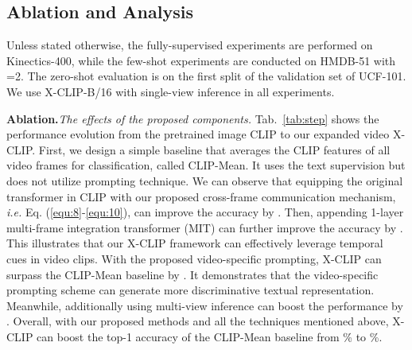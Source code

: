 \documentclass[runningheads]{llncs}
\begin{document}
 

\subsection{Ablation and Analysis}\label{sec:ablation}
Unless stated otherwise, the fully-supervised experiments are performed on Kinectics-400, while the few-shot experiments are conducted on HMDB-51 with =2. The zero-shot evaluation is on the first split of the validation set of UCF-101. We use X-CLIP-B/16 with single-view inference in all experiments.

\noindent\textbf{Ablation.}\textit{The effects of the proposed components.} Tab.~\ref{tab:step} shows the performance evolution from the pretrained image CLIP to our expanded video X-CLIP. First, we design a simple baseline that averages the CLIP features of all video frames for classification, called CLIP-Mean. It uses the text supervision but does not utilize prompting technique. We can observe that equipping the original transformer in CLIP with our proposed  cross-frame communication mechanism, \emph{i.e.} Eq. (\ref{equ:8}-\ref{equ:10}), can improve the accuracy by . Then, appending 1-layer multi-frame integration transformer (MIT) can further improve the accuracy by . This illustrates that our X-CLIP framework can effectively leverage temporal cues in video clips. With the proposed video-specific prompting, X-CLIP can surpass the CLIP-Mean baseline by . It demonstrates that the video-specific prompting scheme can generate more discriminative textual representation. Meanwhile, additionally using multi-view inference can boost the performance by . Overall, with our proposed methods and all the techniques mentioned above, X-CLIP can boost the top-1 accuracy of the CLIP-Mean baseline from \% to \%.
\end{document}
